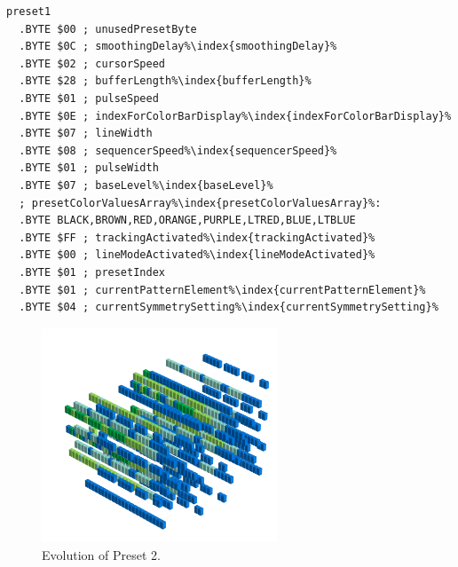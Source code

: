 \begin{minipage}[b]{0.48\linewidth}                            
                                                                           
\begin{lstlisting}[basicstyle=\ttfamily\scriptsize,caption=Data structure for Preset 1.,escapechar=\%]
preset1
  .BYTE $00 ; unusedPresetByte
  .BYTE $0C ; smoothingDelay%\index{smoothingDelay}%
  .BYTE $02 ; cursorSpeed
  .BYTE $28 ; bufferLength%\index{bufferLength}%
  .BYTE $01 ; pulseSpeed
  .BYTE $0E ; indexForColorBarDisplay%\index{indexForColorBarDisplay}%
  .BYTE $07 ; lineWidth
  .BYTE $08 ; sequencerSpeed%\index{sequencerSpeed}%
  .BYTE $01 ; pulseWidth
  .BYTE $07 ; baseLevel%\index{baseLevel}%
  ; presetColorValuesArray%\index{presetColorValuesArray}%: 
  .BYTE BLACK,BROWN,RED,ORANGE,PURPLE,LTRED,BLUE,LTBLUE
  .BYTE $FF ; trackingActivated%\index{trackingActivated}%
  .BYTE $00 ; lineModeActivated%\index{lineModeActivated}%
  .BYTE $01 ; presetIndex
  .BYTE $01 ; currentPatternElement%\index{currentPatternElement}%
  .BYTE $04 ; currentSymmetrySetting%\index{currentSymmetrySetting}%
\end{lstlisting}
\end{minipage}
\begin{minipage}[b]{0.48\linewidth}

\begin{figure}[H]                                                          
  \centering                                                             
  \begin{adjustbox}{width=7cm,center}                                   
  \includegraphics[width=7cm]{src/presets/pattern2-45.png}%
  \end{adjustbox}                                                        
\caption{Evolution of Preset 2.}                                           
\end{figure}                                                               
\end{minipage}
